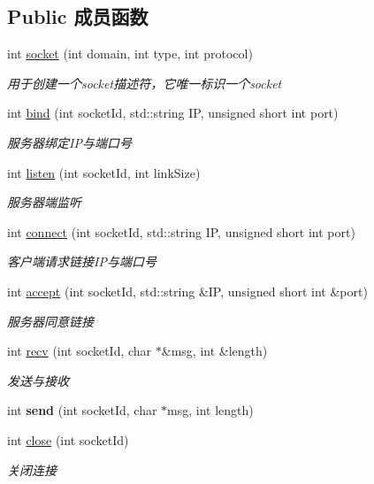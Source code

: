 \subsection*{Public 成员函数}
\begin{DoxyCompactItemize}
\item 
int \hyperlink{class_c_socket_abc15c93dfbf879f5dacc8b4b5dd951b1}{socket} (int domain, int type, int protocol)
\begin{DoxyCompactList}\small\item\em 用于创建一个socket描述符，它唯一标识一个socket \end{DoxyCompactList}\item 
int \hyperlink{class_c_socket_a498e08712781a360f2cb2279bd1151c4}{bind} (int socket\+Id, std\+::string IP, unsigned short int port)
\begin{DoxyCompactList}\small\item\em 服务器绑定\+I\+P与端口号 \end{DoxyCompactList}\item 
int \hyperlink{class_c_socket_acfbd568b041bb6ac35c5fc862aee28f1}{listen} (int socket\+Id, int link\+Size)
\begin{DoxyCompactList}\small\item\em 服务器端监听 \end{DoxyCompactList}\item 
int \hyperlink{class_c_socket_a7c54f8c3c1fef6dd1c84c105e99ddbb1}{connect} (int socket\+Id, std\+::string IP, unsigned short int port)
\begin{DoxyCompactList}\small\item\em 客户端请求链接\+I\+P与端口号 \end{DoxyCompactList}\item 
int \hyperlink{class_c_socket_aaf0c338bcac7bbb4b9a4e57f62c7e7df}{accept} (int socket\+Id, std\+::string \&IP, unsigned short int \&port)
\begin{DoxyCompactList}\small\item\em 服务器同意链接 \end{DoxyCompactList}\item 
\mbox{\label{class_c_socket_aafbbf6818bd94b8fda58b8a7ee8417c3}} 
int \hyperlink{class_c_socket_aafbbf6818bd94b8fda58b8a7ee8417c3}{recv} (int socket\+Id, char $\ast$\&msg, int \&length)
\begin{DoxyCompactList}\small\item\em 发送与接收 \end{DoxyCompactList}\item 
\mbox{\label{class_c_socket_ab034dd0ed69981237cc8385a6786d5ab}} 
int {\bfseries send} (int socket\+Id, char $\ast$msg, int length)
\item 
int \hyperlink{class_c_socket_a1af720c8b15569d9f8f6abd91bc1bfe7}{close} (int socket\+Id)
\begin{DoxyCompactList}\small\item\em 关闭连接 \end{DoxyCompactList}\end{DoxyCompactItemize}


